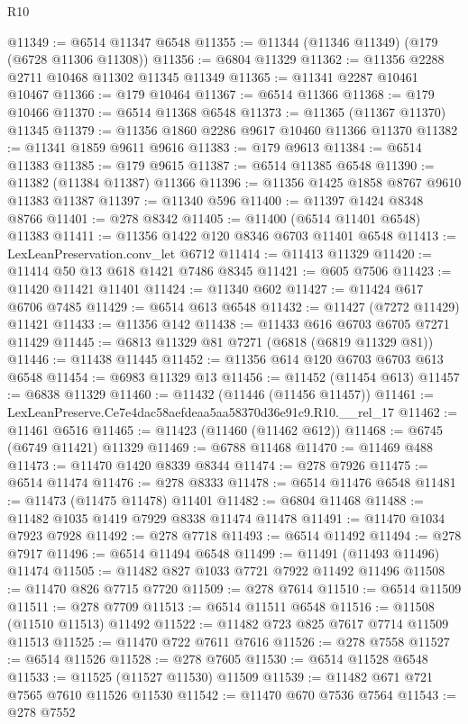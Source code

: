 \begin{lexlean}{R10}
\begin{coremodule}
@11349 := @6514 @11347 @6548
@11355 := @11344 (@11346 @11349) (@179 (@6728 @11306 @11308))
@11356 := @6804 @11329
@11362 := @11356 @2288 @2711 @10468 @11302 @11345 @11349
@11365 := @11341 @2287 @10461 @10467
@11366 := @179 @10464
@11367 := @6514 @11366
@11368 := @179 @10466
@11370 := @6514 @11368 @6548
@11373 := @11365 (@11367 @11370) @11345
@11379 := @11356 @1860 @2286 @9617 @10460 @11366 @11370
@11382 := @11341 @1859 @9611 @9616
@11383 := @179 @9613
@11384 := @6514 @11383
@11385 := @179 @9615
@11387 := @6514 @11385 @6548
@11390 := @11382 (@11384 @11387) @11366
@11396 := @11356 @1425 @1858 @8767 @9610 @11383 @11387
@11397 := @11340 @596
@11400 := @11397 @1424 @8348 @8766
@11401 := @278 @8342
@11405 := @11400 (@6514 @11401 @6548) @11383
@11411 := @11356 @1422 @120 @8346 @6703 @11401 @6548
@11413 := LexLeanPreservation.conv_let @6712
@11414 := @11413 @11329
@11420 := @11414 @50 @13 @618 @1421 @7486 @8345
@11421 := @605 @7506
@11423 := @11420 @11421 @11401
@11424 := @11340 @602
@11427 := @11424 @617 @6706 @7485
@11429 := @6514 @613 @6548
@11432 := @11427 (@7272 @11429) @11421
@11433 := @11356 @142
@11438 := @11433 @616 @6703 @6705 @7271 @11429
@11445 := @6813 @11329 @81 @7271 (@6818 (@6819 @11329 @81))
@11446 := @11438 @11445
@11452 := @11356 @614 @120 @6703 @6703 @613 @6548
@11454 := @6983 @11329 @13
@11456 := @11452 (@11454 @613)
@11457 := @6838 @11329
@11460 := @11432 (@11446 (@11456 @11457))
@11461 := LexLeanPreserve.Ce7e4dac58aefdeaa5aa58370d36e91c9.R10.__rel_17
@11462 := @11461 @6516
@11465 := @11423 (@11460 (@11462 @612))
@11468 := @6745 (@6749 @11421) @11329
@11469 := @6788 @11468
@11470 := @11469 @488
@11473 := @11470 @1420 @8339 @8344
@11474 := @278 @7926
@11475 := @6514 @11474
@11476 := @278 @8333
@11478 := @6514 @11476 @6548
@11481 := @11473 (@11475 @11478) @11401
@11482 := @6804 @11468
@11488 := @11482 @1035 @1419 @7929 @8338 @11474 @11478
@11491 := @11470 @1034 @7923 @7928
@11492 := @278 @7718
@11493 := @6514 @11492
@11494 := @278 @7917
@11496 := @6514 @11494 @6548
@11499 := @11491 (@11493 @11496) @11474
@11505 := @11482 @827 @1033 @7721 @7922 @11492 @11496
@11508 := @11470 @826 @7715 @7720
@11509 := @278 @7614
@11510 := @6514 @11509
@11511 := @278 @7709
@11513 := @6514 @11511 @6548
@11516 := @11508 (@11510 @11513) @11492
@11522 := @11482 @723 @825 @7617 @7714 @11509 @11513
@11525 := @11470 @722 @7611 @7616
@11526 := @278 @7558
@11527 := @6514 @11526
@11528 := @278 @7605
@11530 := @6514 @11528 @6548
@11533 := @11525 (@11527 @11530) @11509
@11539 := @11482 @671 @721 @7565 @7610 @11526 @11530
@11542 := @11470 @670 @7536 @7564
@11543 := @278 @7552

\end{coremodule}
\end{lexlean}
